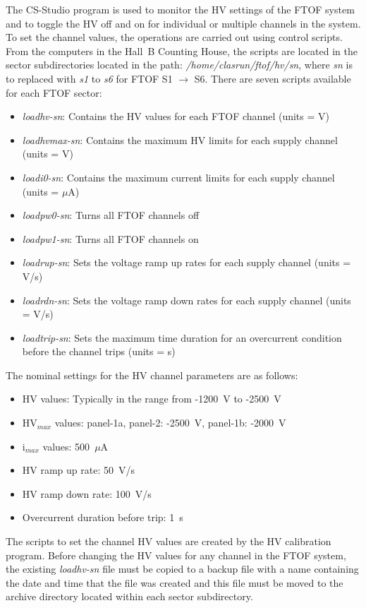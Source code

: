 \documentclass[letterpaper,10pt]{article}
\begin{document}
The CS-Studio program is used to monitor the HV settings of the FTOF system and to toggle the HV off
and on for individual or multiple channels in the system. To set the channel values, the operations
are carried out using control scripts. From the computers in the Hall~B Counting House, the scripts 
are located in the sector subdirectories located in the path: {\it /home/clasrun/ftof/hv/sn}, where
{\it sn} is to replaced with {\it s1} to {\it s6} for FTOF S1 $\to$ S6. There are seven scripts 
available for each FTOF sector:

\begin{itemize}
\item {\it loadhv-sn}: Contains the HV values for each FTOF channel (units = V)
\item {\it loadhvmax-sn}: Contains the maximum HV limits for each supply channel (units = V)
\item {\it loadi0-sn}: Contains the maximum current limits for each supply channel (units = $\mu$A)
\item {\it loadpw0-sn}: Turns all FTOF channels off
\item {\it loadpw1-sn}: Turns all FTOF channels on
\item {\it loadrup-sn}: Sets the voltage ramp up rates for each supply channel (units = V/s)
\item {\it loadrdn-sn}: Sets the voltage ramp down rates for each supply channel (units = V/s)
\item {\it loadtrip-sn}: Sets the maximum time duration for an overcurrent condition before the 
channel trips (units = s)
\end{itemize}

The nominal settings for the HV channel parameters are as follows:

\begin{itemize}
\item HV values: Typically in the range from -1200~V to -2500~V
\item HV$_{max}$ values: panel-1a, panel-2: -2500~V, panel-1b: -2000~V
\item i$_{max}$ values: 500~$\mu$A
\item HV ramp up rate: 50~V/s
\item HV ramp down rate: 100~V/s
\item Overcurrent duration before trip: 1~s
\end{itemize}

The scripts to set the channel HV values are created by the HV calibration program. Before changing 
the HV values for any channel in the FTOF system, the existing {\it loadhv-sn} file must be copied to 
a backup file with a name containing the date and time that the file was created and this file must be 
moved to the archive directory located within each sector subdirectory.
\end{document}
